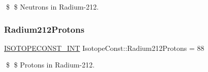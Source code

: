 \$ \$ Neutrons in Radium-\/212. \mbox{\label{group___isotope_const-_radium-_ra212_ga4a7afe8b4334a1fbf247bc978320bece}} 
\subsubsection{\texorpdfstring{Radium212\+Protons}{Radium212Protons}}
{\footnotesize\ttfamily \mbox{\hyperlink{group___isotope_const-_macros_ga5f18360b3e99483a35c32d789e62621c}{I\+S\+O\+T\+O\+P\+E\+C\+O\+N\+S\+T\+\_\+\+I\+NT}} Isotope\+Const\+::\+Radium212\+Protons = 88}

\$ \$ Protons in Radium-\/212. 